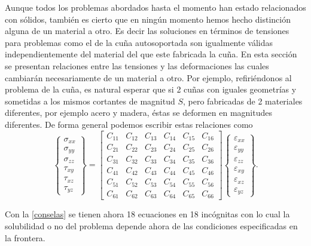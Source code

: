 \documentclass[../notas medios.tex]{subfiles}
\begin{document}
Aunque todos los problemas abordados hasta el momento han estado relacionados con sólidos, también es cierto que en ningún momento hemos hecho distinción alguna de un material a otro. Es decir las soluciones en términos de tensiones para problemas como el de la cuña autosoportada son igualmente válidas independientemente del material del que este fabricada la cuña. En esta sección se presentan  relaciones entre las tensiones y las deformaciones las cuales cambiarán necesariamente de un material a otro. Por ejemplo, refiriéndonos al problema de la cuña, es natural esperar que si 2 cuñas con iguales geometrías y sometidas a los mismos cortantes de magnitud $S$, pero fabricadas de 2 materiales diferentes, por ejemplo acero y madera, éstas se deformen en magnitudes diferentes. De forma general podemos escribir estas relaciones como
\begin{equation}
\left\{ \begin{array}{*{20}{c}}
\sigma_{xx}\\
\sigma _{yy}\\
\sigma _{zz}\\
\tau_{xy}\\
\tau_{xz}\\
\tau_{yz}
\end{array} \right\} = \left[ \begin{array}{*{20}{c}}
C_{11} &C_{12} &C_{13} &C_{14} &C_{15} &C_{16}\\
C_{21} &C_{22} &C_{23} &C_{24} &C_{25} &C_{26}\\
C_{31} &C_{32} &C_{33} &C_{34} &C_{35} &C_{36}\\
C_{41} &C_{42} &C_{43} &C_{44} &C_{45} &C_{46}\\
C_{51} &C_{52} &C_{53} &C_{54} &C_{55} &C_{56}\\
C_{61} &C_{62} &C_{63} &C_{64} &C_{65} &C_{66}
\end{array} \right]\left\{ \begin{array}{*{20}{c}}
\varepsilon_{xx}\\
\varepsilon_{yy}\\
\varepsilon_{zz}\\
\varepsilon_{xy}\\
\varepsilon_{xz}\\
\varepsilon_{yz}
\end{array} \right\}.
\label{conselas}
\end{equation}

Con la \cref{conselas} se tienen ahora 18 ecuaciones en 18 incógnitas con lo cual la solubilidad o no del problema depende ahora de las condiciones especificadas en la frontera.
\end{document}
